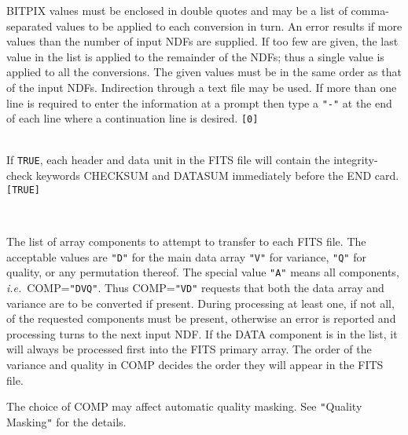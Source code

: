 \documentclass[twoside,11pt]{article}
\newcommand{\htmlref}[2]{#1}
\newcommand{\dqt}[1]{{\texttt{"#1"}}}
\newcommand{\sstsubsection}[1]{ \item[{#1}] \mbox{} \\}
\newcommand{\sstsubsection}[1]{\item[{#1}]}
\begin{document}
{{{         BITPIX values must be enclosed in double quotes and may be a list 
         of comma-separated values to be applied to each conversion in turn.
         An error results if more values than the number of input NDFs are
         supplied.  If too few are given, the last value in the list is
         applied to the remainder of the NDFs; thus a single value is 
         applied to all the conversions.  
         The given values must be in the same order as that of the input NDFs.
         Indirection through a text file may be used.
         If more than one line is required to enter the information at a prompt
         then type a \texttt{"-"} at the end of each line where a
         continuation line is desired.
         \texttt{[0]}
      }
      \sstsubsection{
         CHECKSUM = \_LOGICAL (Read)
      }{
         If \texttt{TRUE}, each header and data unit in the FITS file will
         contain the integrity-check keywords CHECKSUM and DATASUM 
         immediately before the END card.  \texttt{[TRUE]}
      }
      \sstsubsection{
         COMP = LITERAL (Read)
      }{
         The list of array components to attempt to transfer to each
         FITS file.  The acceptable values are \texttt{"D"} for the main data
         array \texttt{"V"} for variance, \texttt{"Q"} for quality, or any
         permutation thereof.
         The special value \texttt{"A"} means all components,
         {\it i.e.}\ COMP=\dqt{DVQ}. Thus COMP=\dqt{VD} requests that 
         both the data array and variance are to be converted if present.  
         During processing at least one, if not all, of the requested
         components must be present, otherwise an error is reported and
         processing turns to the next input NDF.  If the DATA component
         is in the list, it will always be processed first into the
         FITS primary array.  The order of the variance and quality
         in COMP decides the order they will appear in the FITS file.

         The choice of COMP may affect automatic quality masking.  See
         \htmlref{\texttt{"}Quality Masking\texttt{"}}{quality_masking}
         for the details.

}}}
\end{document}
